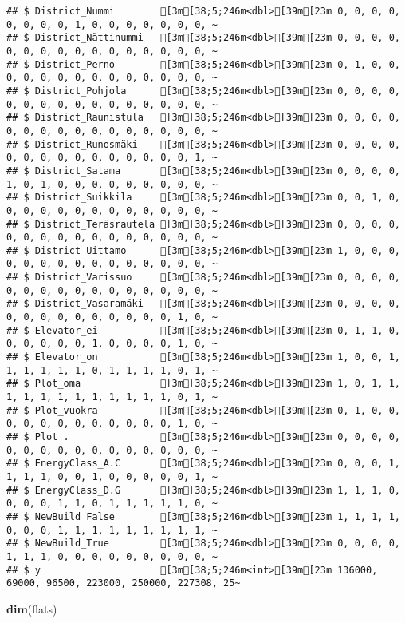 \documentclass[
]{article}
\newenvironment{Shaded}{\begin{snugshade}}{\end{snugshade}}
\newcommand{\KeywordTok}[1]{\textcolor[rgb]{0.13,0.29,0.53}{\textbf{#1}}}
\newcommand{\NormalTok}[1]{#1}
\begin{document}
\begin{verbatim}
## $ District_Nummi        [3m[38;5;246m<dbl>[39m[23m 0, 0, 0, 0, 0, 0, 0, 0, 1, 0, 0, 0, 0, 0, 0, 0, ~
## $ District_Nättinummi   [3m[38;5;246m<dbl>[39m[23m 0, 0, 0, 0, 0, 0, 0, 0, 0, 0, 0, 0, 0, 0, 0, 0, ~
## $ District_Perno        [3m[38;5;246m<dbl>[39m[23m 0, 1, 0, 0, 0, 0, 0, 0, 0, 0, 0, 0, 0, 0, 0, 0, ~
## $ District_Pohjola      [3m[38;5;246m<dbl>[39m[23m 0, 0, 0, 0, 0, 0, 0, 0, 0, 0, 0, 0, 0, 0, 0, 0, ~
## $ District_Raunistula   [3m[38;5;246m<dbl>[39m[23m 0, 0, 0, 0, 0, 0, 0, 0, 0, 0, 0, 0, 0, 0, 0, 0, ~
## $ District_Runosmäki    [3m[38;5;246m<dbl>[39m[23m 0, 0, 0, 0, 0, 0, 0, 0, 0, 0, 0, 0, 0, 0, 0, 1, ~
## $ District_Satama       [3m[38;5;246m<dbl>[39m[23m 0, 0, 0, 0, 1, 0, 1, 0, 0, 0, 0, 0, 0, 0, 0, 0, ~
## $ District_Suikkila     [3m[38;5;246m<dbl>[39m[23m 0, 0, 1, 0, 0, 0, 0, 0, 0, 0, 0, 0, 0, 0, 0, 0, ~
## $ District_Teräsrautela [3m[38;5;246m<dbl>[39m[23m 0, 0, 0, 0, 0, 0, 0, 0, 0, 0, 0, 0, 0, 0, 0, 0, ~
## $ District_Uittamo      [3m[38;5;246m<dbl>[39m[23m 1, 0, 0, 0, 0, 0, 0, 0, 0, 0, 0, 0, 0, 0, 0, 0, ~
## $ District_Varissuo     [3m[38;5;246m<dbl>[39m[23m 0, 0, 0, 0, 0, 0, 0, 0, 0, 0, 0, 0, 0, 0, 0, 0, ~
## $ District_Vasaramäki   [3m[38;5;246m<dbl>[39m[23m 0, 0, 0, 0, 0, 0, 0, 0, 0, 0, 0, 0, 0, 0, 1, 0, ~
## $ Elevator_ei           [3m[38;5;246m<dbl>[39m[23m 0, 1, 1, 0, 0, 0, 0, 0, 0, 1, 0, 0, 0, 0, 1, 0, ~
## $ Elevator_on           [3m[38;5;246m<dbl>[39m[23m 1, 0, 0, 1, 1, 1, 1, 1, 1, 0, 1, 1, 1, 1, 0, 1, ~
## $ Plot_oma              [3m[38;5;246m<dbl>[39m[23m 1, 0, 1, 1, 1, 1, 1, 1, 1, 1, 1, 1, 1, 1, 0, 1, ~
## $ Plot_vuokra           [3m[38;5;246m<dbl>[39m[23m 0, 1, 0, 0, 0, 0, 0, 0, 0, 0, 0, 0, 0, 0, 1, 0, ~
## $ Plot_.                [3m[38;5;246m<dbl>[39m[23m 0, 0, 0, 0, 0, 0, 0, 0, 0, 0, 0, 0, 0, 0, 0, 0, ~
## $ EnergyClass_A.C       [3m[38;5;246m<dbl>[39m[23m 0, 0, 0, 1, 1, 1, 1, 0, 0, 1, 0, 0, 0, 0, 0, 1, ~
## $ EnergyClass_D.G       [3m[38;5;246m<dbl>[39m[23m 1, 1, 1, 0, 0, 0, 0, 1, 1, 0, 1, 1, 1, 1, 1, 0, ~
## $ NewBuild_False        [3m[38;5;246m<dbl>[39m[23m 1, 1, 1, 1, 0, 0, 0, 1, 1, 1, 1, 1, 1, 1, 1, 1, ~
## $ NewBuild_True         [3m[38;5;246m<dbl>[39m[23m 0, 0, 0, 0, 1, 1, 1, 0, 0, 0, 0, 0, 0, 0, 0, 0, ~
## $ y                     [3m[38;5;246m<int>[39m[23m 136000, 69000, 96500, 223000, 250000, 227308, 25~
\end{verbatim}

\begin{Shaded}
\begin{Highlighting}[]
\KeywordTok{dim}\NormalTok{(flats)}
\end{Highlighting}
\end{Shaded}
\end{document}
